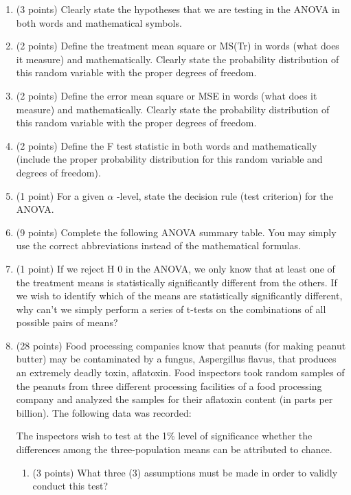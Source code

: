 \documentclass{article}
\begin{document}
\begin{enumerate}
	\item (3 points) Clearly state the hypotheses that we are testing in the ANOVA in both words and mathematical symbols.

	\item (2 points) Define the treatment mean square or MS(Tr) in words (what does it measure) and mathematically. Clearly state the probability distribution of this random variable with the proper degrees of freedom.
	
	\item (2 points) Define the error mean square or MSE in words (what does it measure) and mathematically. Clearly state the probability distribution of this random variable with the proper degrees of freedom.
	
	\item (2 points) Define the F test statistic in both words and mathematically (include the proper probability distribution for this random variable and degrees of freedom).
	
	
	\item (1 point) For a given $\alpha$ -level, state the decision rule (test criterion) for the ANOVA.
	
	
	\item (9 points) Complete the following ANOVA summary table. You may simply use the
correct abbreviations instead of the mathematical formulas.


	\item (1 point) If we reject H 0 in the ANOVA, we only know that at least one of the treatment means is statistically significantly different from the others. If we wish to identify which of the means are statistically significantly different, why can’t we simply perform a series of t-tests on the combinations of all possible pairs of means?
	
	\item (28 points) Food processing companies know that peanuts (for making peanut butter) may be contaminated by a fungus, Aspergillus flavus, that produces an extremely deadly toxin, aflatoxin. Food inspectors took random samples of the peanuts from three different processing facilities of a food processing company and analyzed the samples for their aflatoxin content (in parts per billion). The following data was recorded:

	The inspectors wish to test at the 1\% level of significance whether the differences among the three-population means can be attributed to chance.
	
	\begin{enumerate}
		\item (3 points) What three (3) assumptions must be made in order to validly conduct this test?


\end{enumerate}
\end{enumerate}
\end{document}
